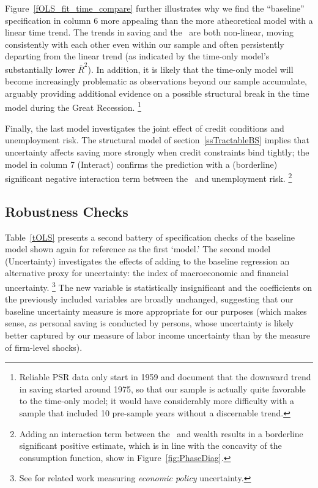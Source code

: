 \documentclass[titlepage]{\econtex}
\begin{document}
Figure~\ref{fOLS_fit_time_compare} further illustrates why we find the
``baseline'' specification in column 6 more appealing than the more
atheoretical model with a linear time trend. The trends in saving and
the \CEA\ are both non-linear, moving consistently with each other
even within our sample and often persistently departing from the
linear trend (as indicated by the time-only model's substantially lower
$\bar{R}^2$).  In addition, it is likely that the time-only model will
become increasingly problematic as observations beyond our sample
accumulate, arguably providing additional evidence on a possible structural
break in the time model during the Great Recession.%
\footnote{  Reliable PSR data only start in 1959 and document that the downward
  trend in saving started around 1975, so that our sample is actually
  quite favorable to the time-only model; it would have considerably more
difficulty with a sample that included 10 pre-sample years without a discernable
trend.}

Finally, the last model investigates the joint effect of credit conditions
and unemployment risk. The structural model of section~\ref{ssTractableBS}
implies that uncertainty affects saving more strongly when credit
constraints bind tightly; the model in column 7 (Interact) confirms the prediction with a (borderline) significant negative interaction term between the \CEA\ and unemployment risk.%
\footnote{  Adding an interaction term between the \CEA\ and wealth results in a
  borderline significant positive estimate, which is in line with the
  concavity of the consumption function, show in
  Figure~\ref{fig:PhaseDiag}.  }

\subsection{Robustness Checks}

Table~\ref{tOLS} presents a second battery of specification checks of
the baseline model shown again for reference as the first `model.'  The second model (Uncertainty) investigates the effects of adding to the baseline regression an
alternative proxy for uncertainty: the
\cite{bloomFloetottoJaimovich_rubc} index of macroeconomic and
financial uncertainty.%
\footnote{See \cite{baker_policyUncertainty} for related work measuring \emph{economic policy} uncertainty.
}
 The new variable is statistically insignificant
and the coefficients on the previously included variables are broadly
unchanged, suggesting that our baseline uncertainty measure is more
appropriate for our purposes (which makes sense, as personal saving is
conducted by persons, whose uncertainty is likely better captured by
our measure of labor income uncertainty than by the
\cite{bloomFloetottoJaimovich_rubc} measure of firm-level shocks).
\end{document}
